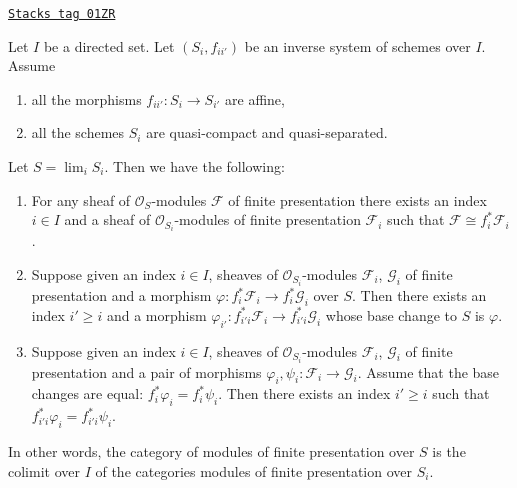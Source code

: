 \begin{lemma}
\label{limits-lemma-descend-modules-finite-presentation}
\href{https://stacks.math.columbia.edu/tag/01ZR}{\texttt{Stacks tag 01ZR}}

Let $I$ be a directed set.
Let $(S_i, f_{ii'})$ be an inverse system of schemes over $I$.
Assume
\begin{enumerate}
\item all the morphisms $f_{ii'} : S_i \to S_{i'}$ are affine,
\item all the schemes $S_i$ are quasi-compact and quasi-separated.
\end{enumerate}
Let $S = \lim_i S_i$. Then we have the following:
\begin{enumerate}
\item For any sheaf of $\mathcal{O}_S$-modules
$\mathcal{F}$ of finite presentation there exists an index
$i \in I$ and a sheaf of $\mathcal{O}_{S_i}$-modules of finite
presentation $\mathcal{F}_i$ such that
$\mathcal{F} \cong f_i^*\mathcal{F}_i$.
\item Suppose given an index $i \in I$, sheaves
of $\mathcal{O}_{S_i}$-modules $\mathcal{F}_i$, $\mathcal{G}_i$
of finite presentation and a morphism
$\varphi : f_i^*\mathcal{F}_i \to f_i^*\mathcal{G}_i$ over $S$.
Then there exists an index $i' \geq i$ and a morphism
$\varphi_{i'} : f_{i'i}^*\mathcal{F}_i \to f_{i'i}^*\mathcal{G}_i$
whose base change to $S$ is $\varphi$.
\item Suppose given an index $i \in I$, sheaves of $\mathcal{O}_{S_i}$-modules
$\mathcal{F}_i$, $\mathcal{G}_i$ of finite presentation
and a pair of morphisms $\varphi_i, \psi_i : \mathcal{F}_i \to \mathcal{G}_i$.
Assume that the base changes are equal: $f_i^*\varphi_i = f_i^*\psi_i$.
Then there exists an index $i' \geq i$ such that
$f_{i'i}^*\varphi_i = f_{i'i}^*\psi_i$.
\end{enumerate}
In other words, the category of modules
of finite presentation over $S$ is the colimit over $I$
of the categories modules of finite presentation over $S_i$.
\end{lemma}

